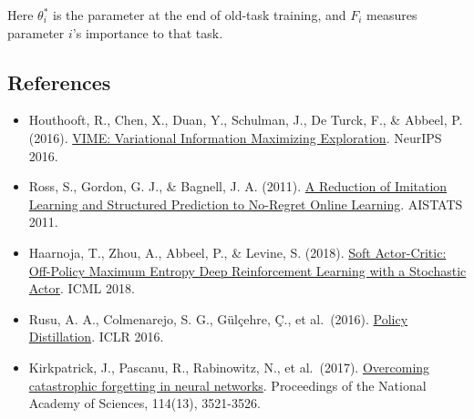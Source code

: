 Here \(\theta_i^{*}\) is the parameter at the end of old-task training, and \(F_i\) measures parameter \(i\)'s importance to that task.

\FloatBarrier
{}
\hypertarget{references-59}{%
\subsection{References}\label{references-59}}

\vspace{0.25em}
\begin{itemize}
\tightlist
\item
  Houthooft, R., Chen, X., Duan, Y., Schulman, J., De Turck, F., \& Abbeel, P. (2016). \href{https://arxiv.org/abs/1605.09674}{VIME: Variational Information Maximizing Exploration}. NeurIPS 2016.
\item
  Ross, S., Gordon, G. J., \& Bagnell, J. A. (2011). \href{https://proceedings.mlr.press/v15/ross11a.html}{A Reduction of Imitation Learning and Structured Prediction to No-Regret Online Learning}. AISTATS 2011.
\item
  Haarnoja, T., Zhou, A., Abbeel, P., \& Levine, S. (2018). \href{https://arxiv.org/abs/1801.01290}{Soft Actor-Critic: Off-Policy Maximum Entropy Deep Reinforcement Learning with a Stochastic Actor}. ICML 2018.
\item
  Rusu, A. A., Colmenarejo, S. G., Gülçehre, Ç., et al.~(2016). \href{https://arxiv.org/abs/1511.06295}{Policy Distillation}. ICLR 2016.
\item
  Kirkpatrick, J., Pascanu, R., Rabinowitz, N., et al.~(2017). \href{https://doi.org/10.1073/pnas.1611835114}{Overcoming catastrophic forgetting in neural networks}. Proceedings of the National Academy of Sciences, 114(13), 3521-3526.
\end{itemize}

\clearpage
